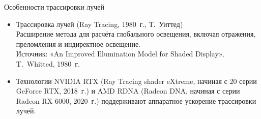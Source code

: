 \documentclass{beamer}
\begin{document}
	\begin{frame}{Особенности трассировки лучей}
				
		\begin{itemize}
			\item 
			Трассировка лучей (Ray Tracing, 1980~г., Т.~Уиттед)\\
			Расширение метода для расчёта глобального освещения, включая отражения, преломления и индиректное освещение.\\
			{Источник:} «An Improved Illumination Model for Shaded Display», T.~Whitted, 1980~г.

			\item
			Технологии NVIDIA RTX (Ray Tracing shader eXtreme, начиная с 20 серии GeForce RTX, 2018~г.) и AMD RDNA (Radeon DNA, начиная с серии Radeon RX 6000, 2020~г.) 
			поддерживают аппаратное ускорение трассировки лучей.

		\end{itemize}

		
	\end{frame}
\end{document}
